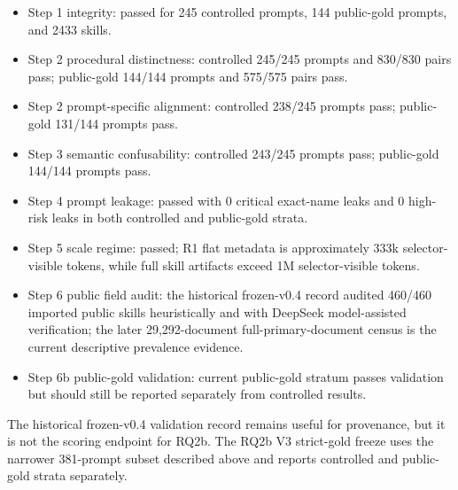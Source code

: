 \begin{itemize}
  \item Step 1 integrity: passed for 245 controlled prompts, 144 public-gold prompts, and 2433 skills.
  \item Step 2 procedural distinctness: controlled 245/245 prompts and 830/830 pairs pass; public-gold 144/144 prompts and 575/575 pairs pass.
  \item Step 2 prompt-specific alignment: controlled 238/245 prompts pass; public-gold 131/144 prompts pass.
  \item Step 3 semantic confusability: controlled 243/245 prompts pass; public-gold 144/144 prompts pass.
  \item Step 4 prompt leakage: passed with 0 critical exact-name leaks and 0 high-risk leaks in both controlled and public-gold strata.
  \item Step 5 scale regime: passed; R1 flat metadata is approximately 333k selector-visible tokens, while full skill artifacts exceed 1M selector-visible tokens.
  \item Step 6 public field audit: the historical frozen-v0.4 record audited 460/460 imported public skills heuristically and with DeepSeek model-assisted verification; the later 29,292-document full-primary-document census is the current descriptive prevalence evidence.
  \item Step 6b public-gold validation: current public-gold stratum passes validation but should still be reported separately from controlled results.
\end{itemize}

The historical frozen-v0.4 validation record remains useful for provenance, but it is not the scoring endpoint for RQ2b. The RQ2b V3 strict-gold freeze uses the narrower 381-prompt subset described above and reports controlled and public-gold strata separately.
